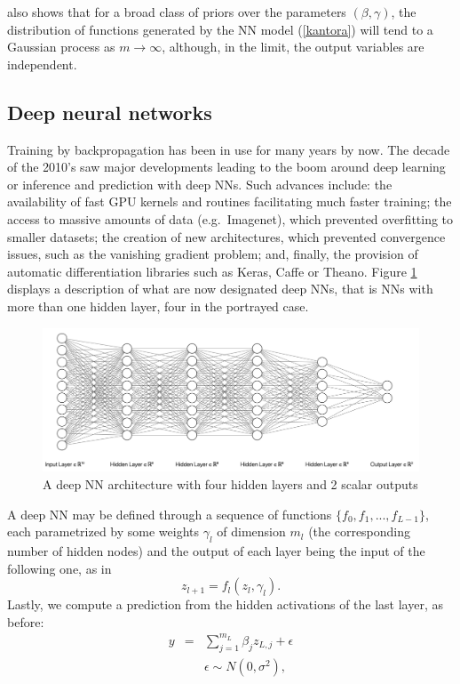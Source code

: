 \noindent
\parencite{neal2012bayesian} also shows that
for a broad class of priors over the parameters 
$(\beta ,\gamma )$, the distribution of functions
generated by the NN model (\ref{kantora})
will tend to a Gaussian
process as  $m\rightarrow \infty$, although, in
the limit, the output variables are independent.

\subsection{Deep neural networks}

Training by backpropagation has been in use 
for many years by now.
The decade of the 2010's saw major developments
leading to 
the boom around deep learning \parencite{deeplearningbook}
or inference and prediction with deep NNs. 
Such advances include:
the availability of fast GPU kernels and routines
facilitating much faster training;
the access to massive amounts of data (e.g.\ Imagenet), which prevented overfitting to smaller datasets; 
the creation of new architectures, which prevented  convergence issues, such as the vanishing gradient problem; 
and, finally, the provision of automatic differentiation libraries such as Keras, Caffe or Theano.
Figure \ref{figuradkk} displays a description
of what are now designated 
deep NNs, that is NNs with more than one hidden
layer, four in the portrayed case.
\begin{figure}
    \centering
    \includegraphics[scale=0.35]{figures/net2.png}
    \caption{A deep NN architecture with four hidden layers and 2 scalar outputs}
    \label{figuradkk}
\end{figure}


A deep NN may be defined through   
a sequence of functions $\lbrace f_0, f_1, ..., f_{L-1} \rbrace$, each parametrized by some weights $\gamma_l$
of dimension $m_l$  (the corresponding number of hidden nodes) and the output of each layer being the input of the following one, as in
$$
    z_{l+1} = f_l ( z_l, \gamma_l).
$$
Lastly, we compute a prediction from the hidden activations of the last layer, as before:
\begin{eqnarray}
y         & = & \sum_{j=1}^{m_L} \beta_j z_{L,j} +
                    \epsilon %
                    \nonumber\\
              & & \epsilon \sim N(0,\sigma^2),
                  \nonumber \\
\end{eqnarray}

